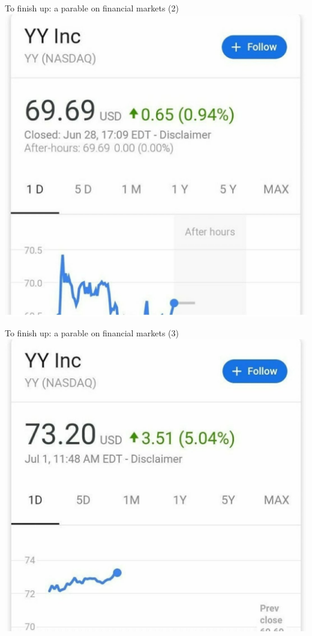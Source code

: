 \begin{frame}{To finish up: a parable on financial markets (2)}
	\centering \includegraphics[width=0.6\paperwidth]{pics/yy2}
\end{frame}


\begin{frame}{To finish up: a parable on financial markets (3)}
	\centering \includegraphics[width=0.6\paperwidth]{pics/yy3}
\end{frame}


